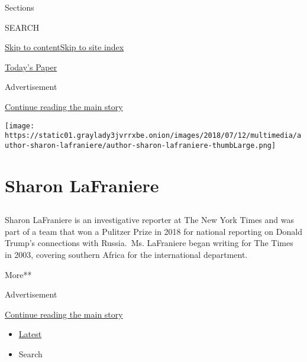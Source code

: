 Sections

SEARCH

\protect\hyperlink{site-content}{Skip to
content}\protect\hyperlink{site-index}{Skip to site index}

\href{https://myaccount.nytimes3xbfgragh.onion/auth/login?response_type=cookie\&client_id=vi}{}

\href{https://www.nytimes3xbfgragh.onion/section/todayspaper}{Today's
Paper}

Advertisement

\protect\hyperlink{after-top}{Continue reading the main story}

\texttt{[image: https://static01.graylady3jvrrxbe.onion/images/2018/07/12/multimedia/author-sharon-lafraniere/author-sharon-lafraniere-thumbLarge.png]}

\hypertarget{sharon-lafraniere}{%
\section{Sharon LaFraniere}\label{sharon-lafraniere}}

\subsection{}

Sharon LaFraniere is an investigative reporter at The New York Times and
was part of a team that won a Pulitzer Prize in 2018 for national
reporting on Donald Trump's connections with Russia.~Ms. LaFraniere
began writing for The Times in 2003, covering southern Africa for the
international department.

More**

Advertisement

\protect\hyperlink{after-mid1}{Continue reading the main story}

\begin{itemize}
\tightlist
\item
  \protect\hyperlink{stream-panel}{Latest}
\item
  Search
\end{itemize}


